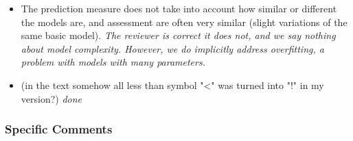 \begin{itemize}
\begin{itemize}
    
    
    

    \item The prediction measure does not take into account how similar or different the models are, and assessment are often very similar (slight variations of the same basic model).
    \textit{\newline The reviewer is correct it does not, and we say nothing about model complexity. However, we do implicitly address overfitting, a problem with models with many parameters.}

    \item (in the text somehow all less than symbol "<" was turned into "!" in my version?)
    \textit{\newline done}

\end{itemize}


\subsubsection*{Specific Comments}


\end{itemize}
